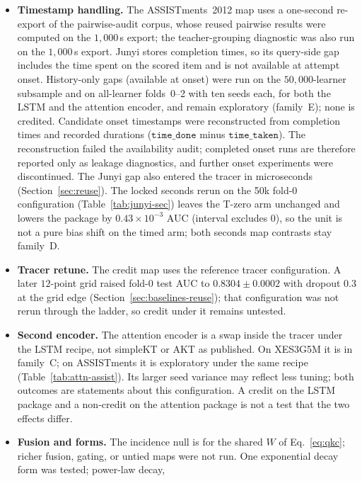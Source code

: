 \documentclass[review,12pt]{elsarticle}
\begin{document}
\begin{itemize}
  branched arms, is reported in Section~\ref{sec:nov5-followup}: all
  three contrasts are positive and not credited.
  \item \textbf{Timestamp handling.} The ASSISTments~2012 map uses a
  one-second re-export of the pairwise-audit corpus, whose reused
  pairwise results were computed on the $1{,}000$\,s export; the
  teacher-grouping diagnostic was also run on the $1{,}000$\,s export.
  Junyi stores completion times, so its query-side gap includes the
  time spent on the scored item and is not available at attempt
  onset. History-only gaps (available at onset) were run on the
  $50{,}000$-learner subsample and on all-learner folds~0--2 with ten
  seeds each, for both the LSTM and the attention encoder, and remain
  exploratory (family~E); none is credited.
  Candidate onset timestamps were reconstructed from completion times
  and recorded durations ($\texttt{time\_done}$ minus
  $\texttt{time\_taken}$). The reconstruction failed the availability
  audit; completed onset runs are therefore reported only as leakage
  diagnostics, and further onset experiments were discontinued.
  The Junyi gap also entered the tracer in microseconds
  (Section~\ref{sec:reuse}). The locked seconds rerun on the 50k fold-0
  configuration (Table~\ref{tab:junyi-sec}) leaves the T-zero arm
  unchanged and lowers the package by $0.43\times 10^{-3}$ AUC
  (interval excludes 0), so the unit is not a pure bias shift on the
  timed arm; both seconds map contrasts stay family~D.
  \item \textbf{Tracer retune.} The credit map uses the reference
  tracer configuration. A later $12$-point grid raised fold-0 test AUC
  to $0.8304{\pm}0.0002$ with dropout $0.3$ at the grid edge
  (Section~\ref{sec:baselines-reuse}); that configuration was not rerun
  through the ladder, so credit under it remains untested.
  \item \textbf{Second encoder.} The attention encoder is a swap inside
  the tracer under the LSTM recipe, not simpleKT or AKT as published.
  On XES3G5M it is in family~C; on ASSISTments it is exploratory under
  the same recipe (Table~\ref{tab:attn-assist}). Its larger seed
  variance may reflect less tuning; both outcomes are statements about
  this configuration. A credit on the LSTM package and a non-credit on
  the attention package is not a test that the two effects differ.
  \item \textbf{Fusion and forms.} The incidence null is for the shared
  $W$ of Eq.~\eqref{eq:qkc}; richer fusion, gating, or untied maps were
  not run. One exponential decay form was tested; power-law decay,

\end{itemize}
\end{document}
